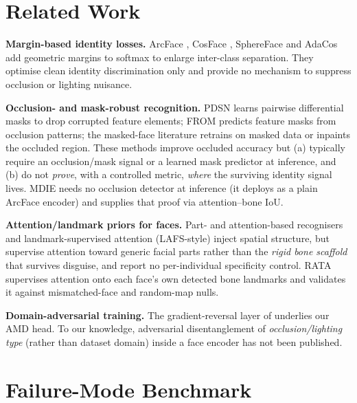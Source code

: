 \documentclass[10pt,conference]{IEEEtran}
\begin{document}
\section{Related Work}
\label{sec:related}

\textbf{Margin-based identity losses.} ArcFace \cite{deng2019arcface},
CosFace \cite{wang2018cosface}, SphereFace \cite{liu2017sphereface} and
AdaCos \cite{zhang2019adacos} add geometric margins to softmax to enlarge
inter-class separation. They optimise clean identity discrimination only and
provide no mechanism to suppress occlusion or lighting nuisance.

\textbf{Occlusion- and mask-robust recognition.} PDSN \cite{song2019occ}
learns pairwise differential masks to drop corrupted feature elements; FROM
\cite{qiu2021from} predicts feature masks from occlusion patterns; the
masked-face literature \cite{anwar2020masked,wang2021maskinv} retrains on
masked data or inpaints the occluded region. These methods improve occluded
accuracy but (a) typically require an occlusion/mask signal or a learned mask
predictor at inference, and (b) do not \emph{prove}, with a controlled metric,
\emph{where} the surviving identity signal lives. MDIE needs no occlusion
detector at inference (it deploys as a plain ArcFace encoder) and supplies that
proof via attention--bone IoU.

\textbf{Attention/landmark priors for faces.} Part- and attention-based
recognisers \cite{song2019occ} and landmark-supervised attention (LAFS-style)
inject spatial structure, but supervise attention toward generic facial parts
rather than the \emph{rigid bone scaffold} that survives disguise, and report
no per-individual specificity control. RATA supervises attention onto each
face's own detected bone landmarks and validates it against mismatched-face and
random-map nulls.

\textbf{Domain-adversarial training.} The gradient-reversal layer of
\cite{ganin2015dann} underlies our AMD head. To our knowledge, adversarial
disentanglement of \emph{occlusion/lighting type} (rather than dataset domain)
inside a face encoder has not been published.

\section{Failure-Mode Benchmark}
\label{sec:bench}
\end{document}
